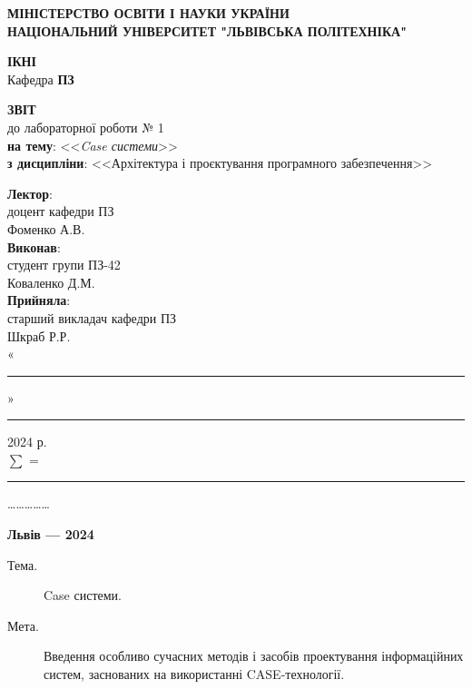 \documentclass[oneside,14pt]{extarticle}
\newcommand\subject{Архітектура і проєктування програмного забезпечення}
\newcommand\lecturer{доцент кафедри ПЗ\\Фоменко А.В.}
\newcommand\teacher{старший викладач кафедри ПЗ\\Шкраб Р.Р.}
\newcommand\mygroup{ПЗ-42}
\newcommand\lab{1}
\newcommand\theme{Case системи}
\newcommand\purpose{Введення особливо сучасних методів і засобів проектування інформаційних систем, заснованих на використанні CASE-технології}
\begin{document}
\begin{normalsize}
	\begin{titlepage}
		\thispagestyle{empty}
		\begin{center}
			\textbf{МІНІСТЕРСТВО ОСВІТИ І НАУКИ УКРАЇНИ\\
				НАЦІОНАЛЬНИЙ УНІВЕРСИТЕТ "ЛЬВІВСЬКА ПОЛІТЕХНІКА"}
		\end{center}
		\begin{flushright}
			\textbf{ІКНІ}\\
			Кафедра \textbf{ПЗ}
		\end{flushright}
		\vspace{80pt}
		\begin{center}
			\textbf{ЗВІТ}\\
			\vspace{10pt}
			до лабораторної роботи № \lab\\
			\textbf{на тему}: <<\textit{\theme}>>\\
			\textbf{з дисципліни}: <<\subject>>
		\end{center}
		\vspace{80pt}
		\begin{flushright}
			
			\textbf{Лектор}:\\
			\lecturer\\
			\vspace{28pt}
			\textbf{Виконав}:\\
			
			студент групи \mygroup\\
			Коваленко Д.М.\\
			\vspace{28pt}
			\textbf{Прийняла}:\\
			
			\teacher\\
			
			\vspace{28pt}
			«\rule{1cm}{0.15mm}» \rule{1.5cm}{0.15mm} 2024 р.\\
			$\sum$ = \rule{1cm}{0.15mm}……………\\
			
		\end{flushright}
		\vspace{\fill}
		\begin{center}
			\textbf{Львів — 2024}
		\end{center}
	\end{titlepage}
		
	\begin{description}
		\item[Тема.] \theme.
		\item[Мета.] \purpose.
	\end{description}


\end{normalsize}
\end{document}

